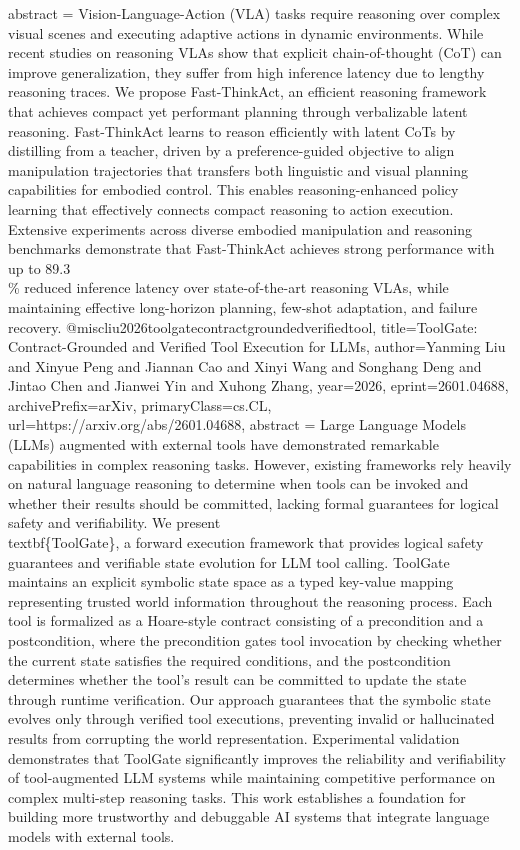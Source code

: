 {      abstract = {Vision-Language-Action (VLA) tasks require reasoning over complex visual scenes and executing adaptive actions in dynamic environments. While recent studies on reasoning VLAs show that explicit chain-of-thought (CoT) can improve generalization, they suffer from high inference latency due to lengthy reasoning traces. We propose Fast-ThinkAct, an efficient reasoning framework that achieves compact yet performant planning through verbalizable latent reasoning. Fast-ThinkAct learns to reason efficiently with latent CoTs by distilling from a teacher, driven by a preference-guided objective to align manipulation trajectories that transfers both linguistic and visual planning capabilities for embodied control. This enables reasoning-enhanced policy learning that effectively connects compact reasoning to action execution. Extensive experiments across diverse embodied manipulation and reasoning benchmarks demonstrate that Fast-ThinkAct achieves strong performance with up to 89.3\\\% reduced inference latency over state-of-the-art reasoning VLAs, while maintaining effective long-horizon planning, few-shot adaptation, and failure recovery.}
}@misc{liu2026toolgatecontractgroundedverifiedtool,
      title={ToolGate: Contract-Grounded and Verified Tool Execution for LLMs}, 
      author={Yanming Liu and Xinyue Peng and Jiannan Cao and Xinyi Wang and Songhang Deng and Jintao Chen and Jianwei Yin and Xuhong Zhang},
      year={2026},
      eprint={2601.04688},
      archivePrefix={arXiv},
      primaryClass={cs.CL},
      url={https://arxiv.org/abs/2601.04688},
      abstract = {Large Language Models (LLMs) augmented with external tools have demonstrated remarkable capabilities in complex reasoning tasks. However, existing frameworks rely heavily on natural language reasoning to determine when tools can be invoked and whether their results should be committed, lacking formal guarantees for logical safety and verifiability. We present \\textbf\{ToolGate\}, a forward execution framework that provides logical safety guarantees and verifiable state evolution for LLM tool calling. ToolGate maintains an explicit symbolic state space as a typed key-value mapping representing trusted world information throughout the reasoning process. Each tool is formalized as a Hoare-style contract consisting of a precondition and a postcondition, where the precondition gates tool invocation by checking whether the current state satisfies the required conditions, and the postcondition determines whether the tool's result can be committed to update the state through runtime verification. Our approach guarantees that the symbolic state evolves only through verified tool executions, preventing invalid or hallucinated results from corrupting the world representation. Experimental validation demonstrates that ToolGate significantly improves the reliability and verifiability of tool-augmented LLM systems while maintaining competitive performance on complex multi-step reasoning tasks. This work establishes a foundation for building more trustworthy and debuggable AI systems that integrate language models with external tools.}
}
